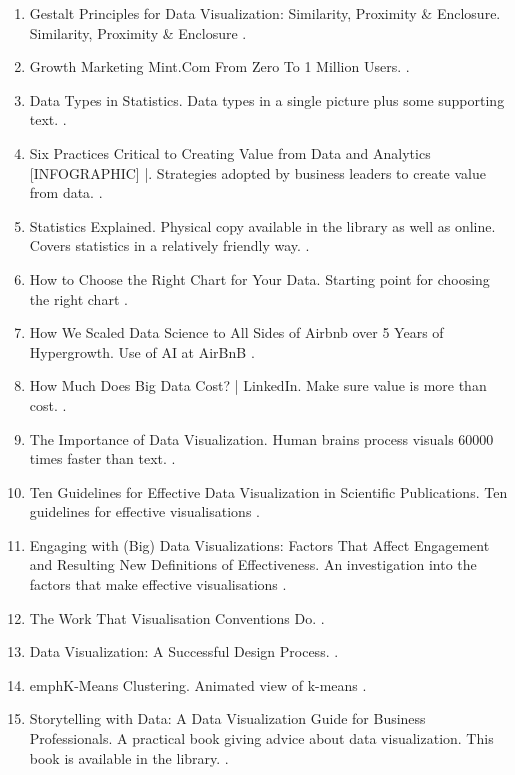 \documentclass[a4paper]{article}
\begin{document}
\begin{enumerate}
\item Gestalt Principles for Data Visualization: Similarity, Proximity \& Enclosure. Similarity, Proximity \& Enclosure \parencite{GestaltPrinciplesData2022}.
\item Growth Marketing Mint.Com From Zero To 1 Million Users.  \parencite{GrowthMarketingMint2017}.
\item Data Types in Statistics. Data types in a single picture plus some supporting text. \parencite{guyDataTypesStatistics2019}.
\item Six Practices Critical to Creating Value from Data and Analytics [INFOGRAPHIC] |. Strategies adopted by business leaders to create value from data. \parencite{hayesSixPracticesCritical2013}.
\item Statistics Explained. Physical copy available in the library as well as online. Covers statistics in a relatively friendly way. \parencite{hinton2014statistics}.
\item How to Choose the Right Chart for Your Data. Starting point for choosing the right chart \parencite{HowChooseRight2022}.
\item How We Scaled Data Science to All Sides of Airbnb over 5 Years of Hypergrowth. Use of AI at AirBnB \parencite{HowWeScaled2015}.
\item How Much Does Big Data Cost? | LinkedIn. Make sure value is more than cost. \parencite{huygheHowMuchDoes2016}.
\item The Importance of Data Visualization. Human brains process visuals 60000 times faster than text. \parencite{ImportanceDataVisualization2022}.
\item Ten Guidelines for Effective Data Visualization in Scientific Publications. Ten guidelines for effective visualisations \parencite{kelleherTenGuidelinesEffective2011}.
\item Engaging with (Big) Data Visualizations: Factors That Affect Engagement and Resulting New Definitions of Effectiveness. An investigation into the factors that make effective visualisations \parencite{kennedyEngagingBigData2016}.
\item The Work That Visualisation Conventions Do.  \parencite{kennedyWorkThatVisualisation2016}.
\item Data Visualization: A Successful Design Process.  \parencite{kirkDataVisualizationSuccessful2012}.
\item emphK-Means Clustering. Animated view of k-means \parencite{KmeansClustering2022}.
\item Storytelling with Data: A Data Visualization Guide for Business Professionals. A practical book giving advice about data visualization. This book is available in the library. \parencite{knaflic2015storytelling}.

\end{enumerate}
\end{document}
